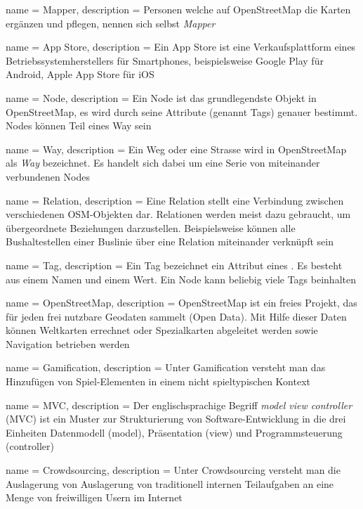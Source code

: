  {
	name = Mapper,
	description = {Personen welche auf OpenStreetMap die Karten ergänzen und pflegen, nennen sich selbst \emph{Mapper}}
}

 {
	name = App Store,
	description = {Ein App Store ist eine Verkaufsplattform eines Betriebssystemherstellers für Smartphones, beispielsweise Google Play für Android, Apple App Store für iOS}
}

 {
	name = Node,
	description = {Ein Node ist das grundlegendste Objekt in OpenStreetMap, es wird durch seine Attribute (genannt \glspl{Tag}) genauer bestimmt. Nodes können Teil eines \gls{Way} sein}
}

 {
	name = Way,
	description = {Ein Weg oder eine Strasse wird in OpenStreetMap als \emph{Way} bezeichnet. Es handelt sich dabei um eine Serie von miteinander verbundenen Nodes}
}

 {
	name = Relation,
	description = {Eine Relation stellt eine Verbindung zwischen verschiedenen OSM-Objekten dar. Relationen werden meist dazu gebraucht, um übergeordnete Beziehungen darzustellen. Beispielsweise können alle Bushaltestellen einer Buslinie über eine Relation miteinander verknüpft sein}
}

 {
	name = Tag,
	description = {Ein Tag bezeichnet ein Attribut eines . Es besteht aus einem Namen und einem Wert. Ein \gls{Node} kann beliebig viele Tags beinhalten}
}

 {
	name = OpenStreetMap,
	description = {OpenStreetMap ist ein freies Projekt, das für jeden frei nutzbare Geodaten sammelt (Open Data). Mit Hilfe dieser Daten können Weltkarten errechnet oder Spezialkarten abgeleitet werden sowie Navigation betrieben werden}
}

 {
	name = Gamification,
	description = {Unter Gamification versteht man das Hinzufügen von Spiel-Elementen in einem nicht spieltypischen Kontext\cite{for-the-win}}
}

 {
	name = MVC,
	description = {Der englischsprachige Begriff \emph{model view controller} (MVC) ist ein Muster zur Strukturierung von Software-Entwicklung in die drei Einheiten Datenmodell (model), Präsentation (view) und Programmsteuerung (controller)\cite{patterns}}
}

 {
	name = Crowdsourcing,
	description = {Unter Crowdsourcing versteht man die Auslagerung von  Auslagerung von traditionell internen Teilaufgaben an eine Menge von freiwilligen Usern im Internet\cite{crowdsourcing}}
}


